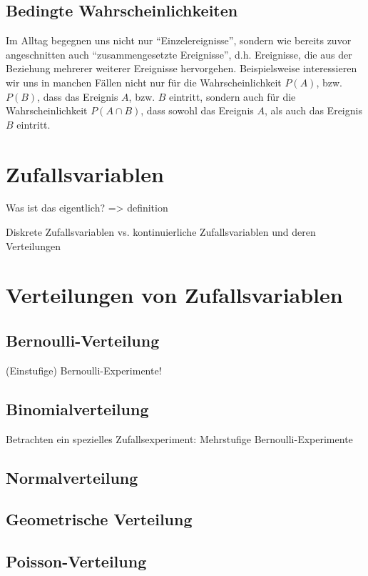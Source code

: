\subsection{Bedingte Wahrscheinlichkeiten}
Im Alltag begegnen uns nicht nur "`Einzelereignisse"', sondern wie bereits zuvor angeschnitten auch "`zusammengesetzte Ereignisse"', d.h. Ereignisse, die aus der Beziehung mehrerer weiterer Ereignisse hervorgehen. Beispielsweise interessieren wir uns in manchen Fällen nicht nur für die Wahrscheinlichkeit \(P(A)\), bzw. \(P(B)\), dass das Ereignis \(A\), bzw. \(B\) eintritt, sondern auch für die Wahrscheinlichkeit \(P(A\cap B)\), dass sowohl das Ereignis \(A\), als auch das Ereignis \(B\) eintritt. 

\section{Zufallsvariablen}
Was ist das eigentlich? => definition

Diskrete Zufallsvariablen vs. kontinuierliche Zufallsvariablen und deren Verteilungen

\section{Verteilungen von Zufallsvariablen}

\subsection{Bernoulli-Verteilung}
(Einstufige) Bernoulli-Experimente!

\subsection{Binomialverteilung}
Betrachten ein spezielles Zufallsexperiment: Mehrstufige Bernoulli-Experimente

\subsection{Normalverteilung}

\subsection{Geometrische Verteilung}

\subsection{Poisson-Verteilung}

